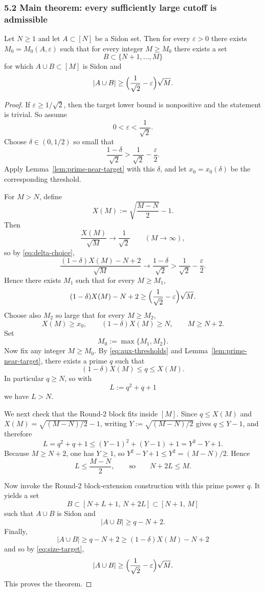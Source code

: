 \subsubsection*{5.2\; Main theorem: every sufficiently large cutoff is admissible}
\begin{theorem}
\label{thm:cofinite-M}
Let $N\ge 1$ and let $A\subset [N]$ be a Sidon set.  Then for every $\varepsilon>0$ there exists $M_0=M_0(A,\varepsilon)$ such that for every integer $M\ge M_0$ there exists a set
\[
B\subset \{N+1,\dots,M\}
\]
for which $A\cup B\subset [M]$ is Sidon and
\[
|A\cup B|\ge \Bigl(\frac1{\sqrt2}-\varepsilon\Bigr)\sqrt M.
\]
\end{theorem}
\begin{proof}
If $\varepsilon\ge 1/\sqrt2$, then the target lower bound is nonpositive and the statement is trivial.  So assume
\[
0<\varepsilon<\frac1{\sqrt2}.
\]
Choose $\delta\in(0,1/2)$ so small that
\begin{equation}
\label{eq:delta-choice}
\frac{1-\delta}{\sqrt2}>\frac1{\sqrt2}-\frac\varepsilon2.
\end{equation}
Apply Lemma~\ref{lem:prime-near-target} with this $\delta$, and let $x_0=x_0(\delta)$ be the corresponding threshold.

For $M>N$, define
\[
X(M):=\sqrt{\frac{M-N}{2}}-1.
\]
Then
\[
\frac{X(M)}{\sqrt M}\longrightarrow \frac1{\sqrt2}
\qquad (M\to\infty),
\]
so by \eqref{eq:delta-choice},
\[
\frac{(1-\delta)X(M)-N+2}{\sqrt M}\longrightarrow \frac{1-\delta}{\sqrt2}>\frac1{\sqrt2}-\frac\varepsilon2.
\]
Hence there exists $M_1$ such that for every $M\ge M_1$,
\begin{equation}
\label{eq:size-target}
(1-\delta)X(M)-N+2\ge \Bigl(\frac1{\sqrt2}-\varepsilon\Bigr)\sqrt M.
\end{equation}
Choose also $M_2$ so large that for every $M\ge M_2$,
\begin{equation}
\label{eq:aux-thresholds}
X(M)\ge x_0,
\qquad
(1-\delta)X(M)\ge N,
\qquad
M\ge N+2.
\end{equation}
Set
\[
M_0:=\max\{M_1,M_2\}.
\]
Now fix any integer $M\ge M_0$.
By \eqref{eq:aux-thresholds} and Lemma~\ref{lem:prime-near-target}, there exists a prime $q$ such that
\[
(1-\delta)X(M)\le q\le X(M).
\]
In particular $q\ge N$, so with
\[
L:=q^2+q+1
\]
we have $L>N$.

We next check that the Round-2 block fits inside $[M]$.
Since $q\le X(M)$ and $X(M)=\sqrt{(M-N)/2}-1$, writing $Y:=\sqrt{(M-N)/2}$ gives $q\le Y-1$, and therefore
\[
L=q^2+q+1\le (Y-1)^2+(Y-1)+1=Y^2-Y+1.
\]
Because $M\ge N+2$, one has $Y\ge 1$, so $Y^2-Y+1\le Y^2=(M-N)/2$.  Hence
\[
L\le \frac{M-N}{2},
\qquad\text{so}\qquad
N+2L\le M.
\]

Now invoke the Round-2 block-extension construction with this prime power $q$.  It yields a set
\[
B\subset [N+L+1,\,N+2L]\subset [N+1,\,M]
\]
such that $A\cup B$ is Sidon and
\[
|A\cup B|\ge q-N+2.
\]
Finally,
\[
|A\cup B|\ge q-N+2\ge (1-\delta)X(M)-N+2
\]
and so by \eqref{eq:size-target},
\[
|A\cup B|\ge \Bigl(\frac1{\sqrt2}-\varepsilon\Bigr)\sqrt M.
\]
This proves the theorem.
\end{proof}

